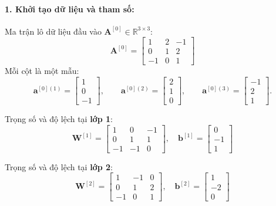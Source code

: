 \paragraph{1. Khởi tạo dữ liệu và tham số:}
Ma trận lô dữ liệu đầu vào $\mathbf{A}^{[0]} \in \mathbb{R}^{3 \times 3}$:
\begin{equation}
\mathbf{A}^{[0]} =
\begin{bmatrix}
    1 & 2 & -1 \\
    0 & 1 & 2 \\
    -1 & 0 & 1
\end{bmatrix}
\end{equation}
Mỗi cột là một mẫu:
\[
\mathbf{a}^{[0](1)} = \begin{bmatrix} 1 \\ 0 \\ -1 \end{bmatrix}, \qquad
\mathbf{a}^{[0](2)} = \begin{bmatrix} 2 \\ 1 \\ 0 \end{bmatrix}, \qquad
\mathbf{a}^{[0](3)} = \begin{bmatrix} -1 \\ 2 \\ 1 \end{bmatrix}.
\]

Trọng số và độ lệch tại \textbf{lớp 1}:
\begin{equation}
\mathbf{W}^{[1]} =
\begin{bmatrix}
    1 & 0 & -1 \\
    0 & 1 & 1 \\
    -1 & -1 & 0
\end{bmatrix},
\quad
\mathbf{b}^{[1]} =
\begin{bmatrix}
    0 \\ -1 \\ 1
\end{bmatrix}
\end{equation}

Trọng số và độ lệch tại \textbf{lớp 2}:
\begin{equation}
\mathbf{W}^{[2]} =
\begin{bmatrix}
    1 & -1 & 0 \\
    0 & 1 & 2 \\
    -1 & 0 & 1
\end{bmatrix},
\quad
\mathbf{b}^{[2]} =
\begin{bmatrix}
    1 \\ -2 \\ 0
\end{bmatrix}
\end{equation}

